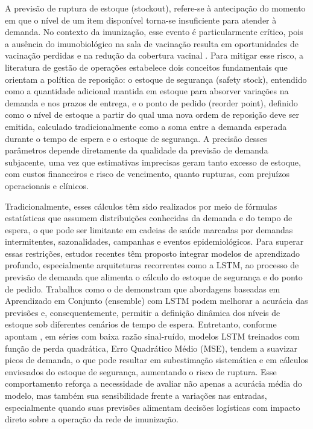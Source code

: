 \documentclass[
    12pt,
    openright,
    oneside,
    a4paper,
    english,
    brazil
]{abntex2}
\begin{document}
A previsão de ruptura de estoque (stockout), refere-se à antecipação do momento em que o nível de um item disponível torna-se insuficiente para atender à demanda. No contexto da imunização, esse evento é particularmente crítico, pois a ausência do imunobiológico na sala de vacinação resulta em oportunidades de vacinação perdidas e na redução da cobertura vacinal \cite{Lopes2022}. Para mitigar esse risco, a literatura de gestão de operações estabelece dois conceitos fundamentais que orientam a política de reposição: o estoque de segurança (safety stock), entendido como a quantidade adicional mantida em estoque para absorver variações na demanda e nos prazos de entrega, e o ponto de pedido (reorder point), definido como o nível de estoque a partir do qual uma nova ordem de reposição deve ser emitida, calculado tradicionalmente como a soma entre a demanda esperada durante o tempo de espera e o estoque de segurança. A precisão desses parâmetros depende diretamente da qualidade da previsão de demanda subjacente, uma vez que estimativas imprecisas geram tanto excesso de estoque, com custos financeiros e risco de vencimento, quanto rupturas, com prejuízos operacionais e clínicos.

Tradicionalmente, esses cálculos têm sido realizados por meio de fórmulas estatísticas que assumem distribuições conhecidas da demanda e do tempo de espera, o que pode ser limitante em cadeias de saúde marcadas por demandas intermitentes, sazonalidades, campanhas e eventos epidemiológicos. Para superar essas restrições, estudos recentes têm proposto integrar modelos de aprendizado profundo, especialmente arquiteturas recorrentes como a LSTM, ao processo de previsão de demanda que alimenta o cálculo do estoque de segurança e do ponto de pedido. Trabalhos como o de  demonstram que abordagens baseadas em Aprendizado em Conjunto (ensemble) com LSTM podem melhorar a acurácia das previsões e, consequentemente, permitir a definição dinâmica dos níveis de estoque sob diferentes cenários de tempo de espera. Entretanto, conforme apontam , em séries com baixa razão sinal-ruído, modelos LSTM treinados com função de perda quadrática, Erro Quadrático Médio (MSE), tendem a suavizar picos de demanda, o que pode resultar em subestimação sistemática e em cálculos enviesados do estoque de segurança, aumentando o risco de ruptura. Esse comportamento reforça a necessidade de avaliar não apenas a acurácia média do modelo, mas também sua sensibilidade frente a variações nas entradas, especialmente quando suas previsões alimentam decisões logísticas com impacto direto sobre a operação da rede de imunização.
\end{document}
